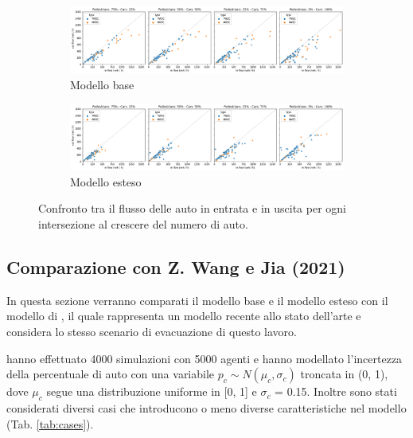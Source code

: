 \begin{figure}[ht]
    \centering
    \begin{subfigure}{\textwidth}
        \centering
        \includegraphics[width=\textwidth]{images/analisi/comparison-base-in-out-flow-car.png}
        \caption{Modello base}
    \end{subfigure}

    \begin{subfigure}{\textwidth}
        \centering
        \includegraphics[width=\textwidth]{images/analisi/comparison-new-in-out-flow-car.png}
        \caption{Modello esteso}
    \end{subfigure}
    \caption{
        Confronto tra il flusso delle auto in entrata e in uscita per ogni intersezione al crescere del numero di auto.
    }
    \label{fig:analisi-comparison-in-out-flow-car}
\end{figure}

\pagebreak



\subsection{Comparazione con Z. Wang e Jia (2021)}
In questa sezione verranno comparati il modello base e il modello esteso con il modello di \textcite{wang2021novel}, 
il quale rappresenta un modello recente allo stato dell'arte e considera lo stesso scenario di evacuazione di questo lavoro.

\textcite{wang2021novel} hanno effettuato 4000 simulazioni con 5000 agenti e
hanno modellato l'incertezza della percentuale di auto con una variabile $p_c \sim N(\mu_c, \sigma_c)$ troncata in (0, 1), 
dove $\mu_c$ segue una distribuzione uniforme in [0, 1] e $\sigma_c$ = 0.15.
Inoltre sono stati considerati diversi casi che introducono o meno diverse caratteristiche nel modello (Tab. \ref{tab:cases}).

